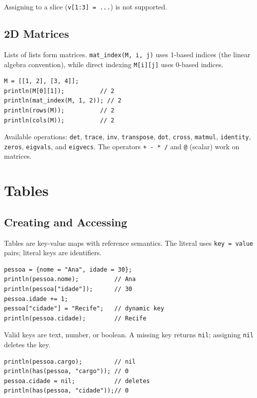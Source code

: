 \documentclass[11pt,a4paper,oneside]{report}
\newcommand{\code}[1]{\texttt{#1}}
\begin{document}
Assigning to a slice (\code{v[1:3] = ...}) is not supported.

\section{2D Matrices}
Lists of lists form matrices. \code{mat\_index(M, i, j)} uses 1-based
indices (the linear algebra convention), while direct indexing
\code{M[i][j]} uses 0-based indices.

\begin{lstlisting}
M = [[1, 2], [3, 4]];
println(M[0][1]);          // 2
println(mat_index(M, 1, 2)); // 2
println(rows(M));          // 2
println(cols(M));          // 2
\end{lstlisting}

Available operations: \code{det}, \code{trace}, \code{inv},
\code{transpose}, \code{dot}, \code{cross}, \code{matmul},
\code{identity}, \code{zeros}, \code{eigvals}, and \code{eigvecs}. The
operators \code{+ - * /} and \code{@} (scalar) work on matrices.

\chapter{Tables}
\label{cap:tabelas}

\section{Creating and Accessing}
Tables are key-value maps with reference semantics. The literal uses
\code{key = value} pairs; literal keys are identifiers.

\begin{lstlisting}
pessoa = {nome = "Ana", idade = 30};
println(pessoa.nome);          // Ana
println(pessoa["idade"]);      // 30
pessoa.idade += 1;
pessoa["cidade"] = "Recife";   // dynamic key
println(pessoa.cidade);        // Recife
\end{lstlisting}

Valid keys are text, number, or boolean. A missing key returns
\code{nil}; assigning \code{nil} deletes the key.

\begin{lstlisting}
println(pessoa.cargo);         // nil
println(has(pessoa, "cargo")); // 0
pessoa.cidade = nil;           // deletes
println(has(pessoa, "cidade"));// 0
\end{lstlisting}
\end{document}
